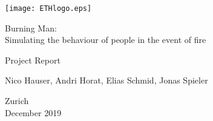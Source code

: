 
\thispagestyle{empty}

\begin{center}
\texttt{[image: ETHlogo.eps]}

\bigskip


\bigskip


\bigskip


\LARGE{ Burning Man:\\ }
\LARGE{ Simulating the behaviour of people in the event of fire\\}

\bigskip

\bigskip

\small{Project Report}\\

\bigskip

\bigskip

\bigskip

\bigskip


\bigskip

\bigskip

\bigskip

\LARGE{Nico Hauser, Andri Horat, Elias Schmid, Jonas Spieler}



\bigskip

\bigskip

\bigskip

\bigskip

\bigskip

\bigskip

\bigskip

\bigskip

Zurich\\
December 2019\\

\end{center}


